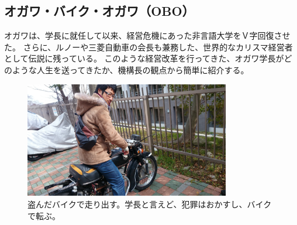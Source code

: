 \subsection{オガワ・バイク・オガワ（OBO）}
オガワは、学長に就任して以来、経営危機にあった非言語大学をＶ字回復させた。
さらに、ルノーや三菱自動車の会長も兼務した、世界的なカリスマ経営者として伝説に残っている。
このような経営改革を行ってきた、オガワ学長がどのような人生を送ってきたか、機構長の観点から簡単に紹介する。

\begin{figure}[h]
\centering
\includegraphics[width=0.8\textwidth]{./section/HigengoUniv/figures/DSC_0113_2.jpg}
\caption{盗んだバイクで走り出す。学長と言えど、犯罪はおかすし、バイクで転ぶ。}
\end{figure}

















